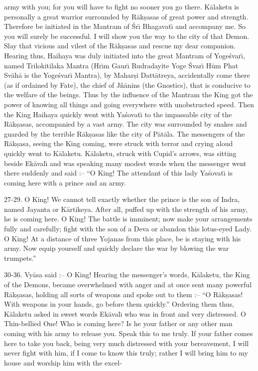 army with you; for you will have to fight no sooner you go there. K\=alaketu is personally a great warrior surrounded by R\=ak\d{s}asas of great power and strength. Therefore be initiated in the Mantram of \'Sr\={\i} Bhagavat\={\i} and accompany me. So you will surely be successful. I will show you the way to the city of that Demon. Slay that vicious and vilest of the R\=ak\d{s}asas and rescue my dear companion. Hearing thus, Haihaya was duly initiated into the great Mantram of Yoge\'svar\={\i}, named Trilokitilaka Mantra (Hr\={\i}m Gaur\={\i} Rudradayite Yoge \'Svar\={\i} H\=um Phat Sv\=ah\=a is the Yoge\'svar\={\i} Mantra), by Mahar\d{s}i Datt\=atreya, accidentally come there (as if ordained by Fate), the chief of J\~n\=anins (the Gnostics), that is conducive to the welfare of the beings. Thus by the influence of the Mantram the King got the power of knowing all things and going everywhere with unobstructed speed. Then the King Haihaya quickly went with Ya\'sovat\={\i} to the impassable city of the R\=ak\d{s}asas, accompanied by a vast army. The city was surrounded by snakes and guarded by the terrible R\=ak\d{s}asas like the city of P\=at\=ala. The messengers of the R\=ak\d{s}asa, seeing the King coming, were struck with terror and crying aloud quickly went to K\=alaketu. K\=alaketu, struck with Cupid's arrows, was sitting beside Ek\=aval\={\i} and was speaking many modest words when the messenger went there suddenly and said :-- ``O King! The attendant of this lady Ya\'sovat\={\i} is coming here with a prince and an army.

27-29. O King! We cannot tell exactly whether the prince is the son of Indra, named Jayanta or K\=artikeya. After all, puffed up with the strength of his army, he is coming here. O King! The battle is imminent; now make your arrangements fully and carefully; fight with the son of a Deva or abandon this lotus-eyed Lady. O King! At a distance of three Yojanas from this place, be is staying with his army. Now equip yourself and quickly declare the war by blowing the war trumpets.''

30-36. Vy\=asa said :-- O King! Hearing the messenger's words, K\=alaketu, the King of the Demons, became overwhelmed with anger and at once sent many powerful R\=ak\d{s}asas, holding all sorts of weapons and spoke out to them :-- ``O R\=ak\d{s}asas! With weapons in your hands, go before them quickly.'' Ordering them thus, K\=alaketu asked in sweet words Ek\=aval\={\i} who was in front and very distressed. O Thin-bellied One! Who is coming here? Is he your father or any other man coming with his army to release you. Speak this to me truly. If your father comes here to take you back, being very much distressed with your bereavement, I will never fight with him, if I come to know this truly; rather I will bring him to my house and worship him with the excel-


